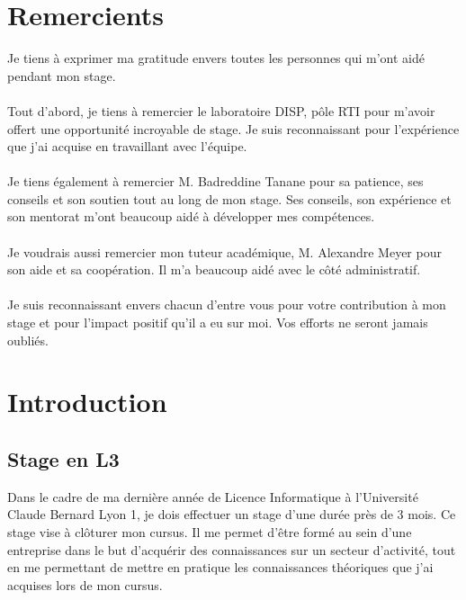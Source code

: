 \documentclass{template}
\begin{document}
\section*{Remercients}
Je tiens à exprimer ma gratitude envers toutes les personnes qui m'ont aidé pendant mon stage. \\ \\
Tout d'abord, je tiens à remercier le laboratoire DISP, pôle RTI pour m'avoir offert une opportunité incroyable de stage. Je suis reconnaissant pour l'expérience que j'ai acquise en travaillant avec l’équipe.\\ \\
Je tiens également à remercier M. Badreddine Tanane pour sa patience, ses conseils et son soutien tout au long de mon stage. Ses conseils, son expérience et son mentorat m'ont beaucoup aidé à développer mes compétences.\\ \\
Je voudrais aussi remercier mon tuteur académique, M. Alexandre Meyer pour son aide et sa coopération. Il m’a beaucoup aidé avec le côté administratif.\\ \\
Je suis reconnaissant envers chacun d'entre vous pour votre contribution à mon stage et pour l'impact positif qu'il a eu sur moi. Vos efforts ne seront jamais oubliés.
\newpage


\tabledematieres %


\listoffigures
\newpage 




\section{Introduction}
\subsection{Stage en L3}
Dans le cadre de ma dernière année de Licence Informatique à l’Université Claude Bernard Lyon 1, je dois effectuer un stage d’une durée près de 3 mois. Ce stage vise à clôturer mon cursus. Il me permet d’être formé au sein d’une entreprise dans le but d’acquérir des connaissances sur un secteur d’activité, tout en me permettant de mettre en pratique les connaissances théoriques que j’ai acquises lors de mon cursus.
\end{document}
